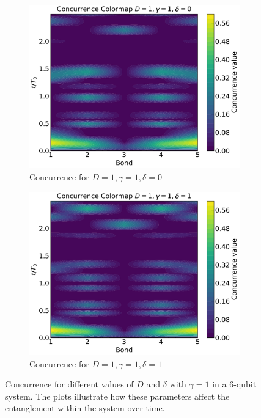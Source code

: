 \begin{figure}[h!]
    \vspace{0.5cm}

    \begin{subfigure}[b]{0.48\textwidth}
        \centering
        \includegraphics[width=\linewidth]{results_and_discussion/6_qubits/up_down_with_ana_1_1_0.pdf}
        \caption{Concurrence for \( D = 1, \gamma = 1, \delta = 0 \)}
        \label{fig:6q_1_1_0}
    \end{subfigure}
    \hfill
    \begin{subfigure}[b]{0.48\textwidth}
        \centering
        \includegraphics[width=\linewidth]{results_and_discussion/6_qubits/up_down_with_ana_1_1_1.pdf}
        \caption{Concurrence for \( D = 1, \gamma = 1, \delta = 1 \)}
        \label{fig:6q_1_1_1}
    \end{subfigure}

    \caption{Concurrence for different values of \( D \) and \( \delta \) with \( \gamma = 1 \) in a 6-qubit system. The plots illustrate how these parameters affect the entanglement within the system over time.}
    \label{fig:concurrence_comparison_6qubits}
\end{figure}





